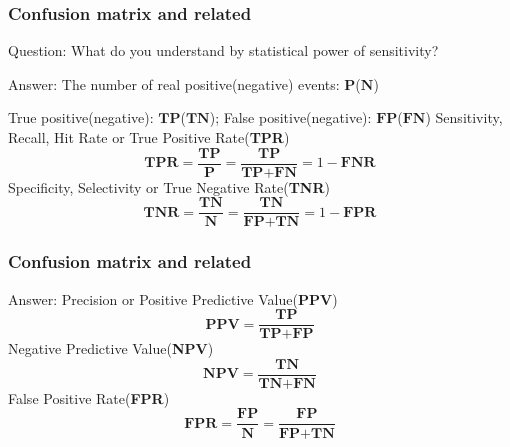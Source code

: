 \documentclass[11pt]{beamer}
\begin{document}
\begin{frame}
\frametitle{Confusion matrix and related}
\begin{block}{Question:}
	What do you understand by statistical power of sensitivity?
\end{block}
\begin{block}{Answer:}
	The number of real positive(negative) events: $\textbf{P}$($\textbf{N}$)
	
	True positive(negative): $\textbf{TP}$($\textbf{TN}$); False positive(negative): $\textbf{FP}$($\textbf{FN}$)
	Sensitivity, Recall, Hit Rate or True Positive Rate(\textbf{TPR})
	\[
		\textbf{TPR} = \frac{\textbf{TP}}{\textbf{P}} = \frac{\textbf{TP}}{\textbf{TP}+\textbf{FN}}
		=1 - \textbf{FNR}
	\]
	Specificity, Selectivity or True Negative Rate(\textbf{TNR})
	\[
		\textbf{TNR} = \frac{\textbf{TN}}{\textbf{N}} = \frac{\textbf{TN}}{\textbf{FP}+\textbf{TN}}
		=1 - \textbf{FPR}
	\]
\end{block}
\end{frame}

\begin{frame}
\frametitle{Confusion matrix and related}
\begin{block}{Answer:}
	Precision or Positive Predictive Value(\textbf{PPV})
	\[
		\textbf{PPV} = \frac{\textbf{TP}}{\textbf{TP}+\textbf{FP}}
	\]
	Negative Predictive Value(\textbf{NPV})
	\[
		\textbf{NPV} = \frac{\textbf{TN}}{\textbf{TN}+\textbf{FN}}
	\]
	False Positive Rate(\textbf{FPR})
	\[
		\textbf{FPR} = \frac{\textbf{FP}}{\textbf{N}} = \frac{\textbf{FP}}{\textbf{FP}+\textbf{TN}}
	\]
\end{block}
\end{frame}
\end{document}
